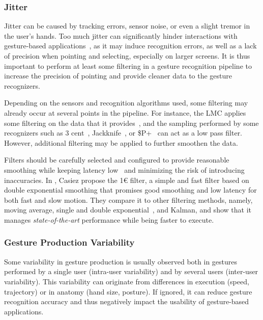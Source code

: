 \subsubsection{Jitter} \label{sec:state_of_the_art:overview:challenges:jitter}
\label{sec:noise}
Jitter can be caused by tracking errors, sensor noise, or even a slight tremor in the user's hands. Too much jitter can significantly hinder interactions with gesture-based applications~\cite{Pavlovych:2009}, as it may induce recognition errors, as well as a lack of precision when pointing and selecting, especially on larger screens. It is thus important to perform at least some filtering in a gesture recognition pipeline to increase the precision of pointing and provide cleaner data to the gesture recognizers.

Depending on the sensors and recognition algorithms used, some filtering may already occur at several points in the pipeline. For instance, the LMC applies some filtering on the data that it provides~\cite{Colgan:2017}, and the sampling performed by some recognizers such as 3 cent~\cite{Caputo:2017}, Jackknife~\cite{Taranta:2017}, or \$P+~\cite{Vatavu:2017a} can act as a low pass filter. However, additional filtering may be applied to further smoothen the data.

Filters should be carefully selected and configured to provide reasonable smoothing while keeping latency low~\cite{Pavlovych:2009} and minimizing the risk of introducing inaccuracies. In \cite{Casiez:2012}, Casiez \etal propose the 1€ filter, a simple and fast filter based on double exponential smoothing that promises good smoothing and low latency for both fast and slow motion. They compare it to other filtering methods, namely, moving average, single and double exponential~\cite{LaViola:2003}, and Kalman, and show that it manages \textit{state-of-the-art} performance while being faster to execute.


\subsubsection{Gesture Production Variability} \label{sec:state_of_the_art:overview:challenges:production-variability}
Some variability in gesture production is usually observed both in gestures performed by a single user (intra-user variability) and by several users (inter-user variability). This variability can originate from differences in execution (\eg speed, trajectory) or in anatomy (\eg hand size, posture). If ignored, it can reduce gesture recognition accuracy and thus negatively impact the usability of gesture-based applications.

